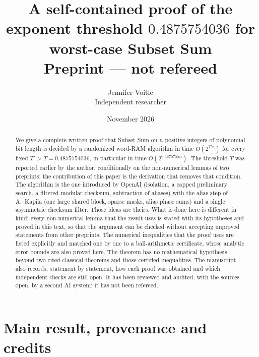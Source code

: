\documentclass[11pt]{article}
\title{A self-contained proof of the exponent threshold $0.4875754036$ for worst-case Subset Sum\\[2pt]
\large Preprint --- not refereed}
\author{Jennifer Voitle\\ Independent researcher}
\date{November 2026}
\theoremstyle{definition}
\begin{document}
\maketitle
\begin{abstract}
We give a complete written proof that Subset Sum on $n$ positive integers of polynomial bit length is decided by a
randomized word-RAM algorithm in time $O(2^{T'n})$ for every fixed $T'>T=0.4875754036$, in particular in time
$O(2^{0.4875755n})$. The threshold $T$ was reported earlier by the author, conditionally on the non-numerical
lemmas of two preprints; the contribution of this paper is the derivation that removes that condition.
The algorithm is the one introduced by OpenAI (isolation, a capped preliminary search, a
filtered modular checksum, subtraction of aliases) with the alias step of A.~Kapila (one large shared block, sparse
masks, alias phase sums) and a single asymmetric checksum filter. Those ideas are theirs. What is done here is
different in kind: every non-numerical lemma that the result uses is stated with its hypotheses and proved in this
text, so that the argument can be checked without accepting unproved statements from other preprints. The numerical
inequalities that the proof uses are listed explicitly and matched one by one to a ball-arithmetic certificate,
whose analytic error bounds are also proved here. The theorem has no mathematical hypothesis beyond two cited
classical theorems and those certified inequalities.
The manuscript also records, statement by statement, how each proof was obtained and which independent checks are
still open. It has been reviewed and audited, with the sources open, by a second
AI system; it has not been refereed.
\end{abstract}

\tableofcontents

\section{Main result, provenance and credits}\label{sec:result}
\end{document}
